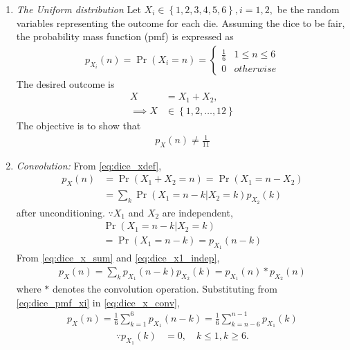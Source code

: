 \documentclass[journal,10pt,twocolumn]{IEEEtran}
\newcounter{Chapcounter}
\numberwithin{equation}{subsection}
\numberwithin{figure}{subsection}
\renewcommand\thesection{\theChapcounter.\arabic{section}}
\providecommand{\pr}[1]{\ensuremath{\Pr\left(#1\right)}}
\providecommand{\cbrak}[1]{\ensuremath{\left\{#1\right\}}}
\renewcommand\thesection{\arabic{section}}
\renewcommand\thesubsection{\thesection.\arabic{subsection}}
\begin{document}
\begin{enumerate}[label=\thesubsection.\arabic*.,ref=\thesubsection.\arabic{figure}]
\item {\em The Uniform distribution} Let $X_i \in \cbrak{1,2,3,4,5,6}, i = 1,2,$ be the random variables representing the outcome for each die.  Assuming the dice to be fair, the probability mass function (pmf) is expressed as 
\begin{align}
\label{eq:dice_pmf_xi}
p_{X_i}(n) = \pr{X_i = n} =
\begin{cases}
\frac{1}{6} & 1 \le n \le 6
\\
0 & otherwise
\end{cases}
\end{align}
The desired outcome is
\begin{align}
\label{eq:dice_xdef}
X &= X_1 + X_2,
\\
\implies X &\in \cbrak{1,2,\dots,12}
\end{align}
The objective is to show that
\begin{align}
p_X(n) \ne \frac{1}{11}
\label{eq:dice_wrong}
\end{align}
\item {\em Convolution: }
From \eqref{eq:dice_xdef},
\begin{align}
p_X(n) &= \pr{X_1 + X_2 = n} = \pr{X_1  = n -X_2}
\\
&= \sum_{k}^{}\pr{X_1  = n -k | X_2 = k}p_{X_2}(k)
\label{eq:dice_x_sum}
\end{align}
after unconditioning.  $\because X_1$ and $X_2$ are independent,
\begin{multline}
\pr{X_1  = n -k | X_2 = k} 
\\
= \pr{X_1  = n -k} = p_{X_1}(n-k)
\label{eq:dice_x1_indep}
\end{multline}
From \eqref{eq:dice_x_sum} and \eqref{eq:dice_x1_indep},
\begin{align}
p_X(n) = \sum_{k}^{}p_{X_1}(n-k)p_{X_2}(k) = p_{X_1}(n)*p_{X_2}(n)
\label{eq:dice_x_conv}
\end{align}
where $*$ denotes the convolution operation. 
Substituting from \eqref{eq:dice_pmf_xi}
in \eqref{eq:dice_x_conv},
\begin{align}
p_X(n) = \frac{1}{6}\sum_{k=1}^{6}p_{X_1}(n-k)= \frac{1}{6}\sum_{k=n-6}^{n-1}p_{X_1}(k)
\label{eq:dice_x_conv_x1}
\end{align}
\begin{align}
\because p_{X_1}(k) &= 0, \quad k \le 1, k \ge 6.

\end{align}
\end{enumerate}
\end{document}
